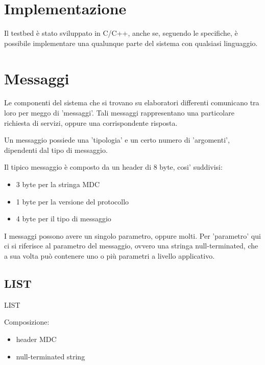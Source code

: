 \section{Implementazione}


Il testbed è stato sviluppato in C/C++, anche se, seguendo le specifiche, è possibile implementare una qualunque parte del sistema con qualsiasi linguaggio.






\section{Messaggi}


Le componenti del sistema che si trovano su elaboratori differenti comunicano tra loro per meggo di 'messaggi'. Tali messaggi rappresentano una particolare richiesta di servizi, oppure una corrispondente risposta.

Un messaggio possiede una 'tipologia' e un certo numero di 'argomenti', dipendenti dal tipo di messaggio.

Il tipico messaggio è composto da un header di 8 byte, cosi' suddivisi:



\begin{itemize}
\item 3 byte per la stringa MDC

\item 1 byte per la versione del protocollo

\item 4 byte per il tipo di messaggio
\end{itemize}

I messaggi possono avere un singolo parametro, oppure molti. Per 'parametro' qui ci si riferisce al parametro del messaggio, ovvero una stringa null-terminated, che a sua volta può contenere uno o più parametri a livello applicativo.






\subsection{LIST}
%

LIST



Composizione:



\begin{itemize}
\item header MDC

\item null-terminated string
\end{itemize}

